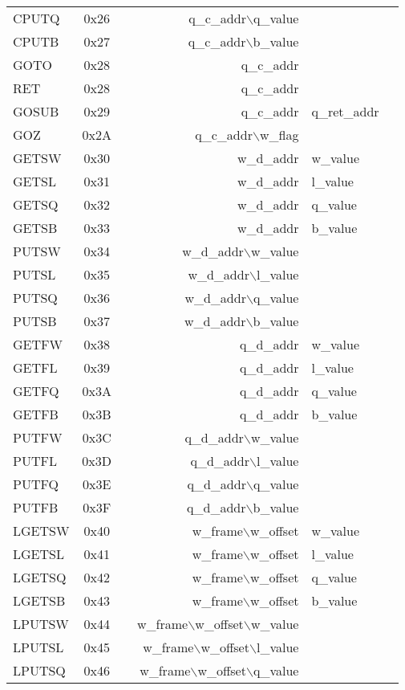 \documentclass {article}
\begin{document}
\begin {tabular}{l|c|l|r@{--}l|l}
CPUTQ	& 0x26	& 		&q\_c\_addr$\backslash$q\_value&\\
CPUTB	& 0x27	& 		&q\_c\_addr$\backslash$b\_value&\\
GOTO	& 0x28	& 		&q\_c\_addr&\\
RET	& 0x28	& 		&q\_c\_addr&\\
GOSUB	& 0x29	& 		&q\_c\_addr&q\_ret\_addr\\
GOZ	& 0x2A	& 		&q\_c\_addr$\backslash$w\_flag&\\
GETSW	& 0x30	& 		&w\_d\_addr&w\_value\\
GETSL	& 0x31	& 		&w\_d\_addr&l\_value\\
GETSQ	& 0x32	& 		&w\_d\_addr&q\_value\\
GETSB	& 0x33	& 		&w\_d\_addr&b\_value\\
PUTSW	& 0x34	& 		&w\_d\_addr$\backslash$w\_value&\\
PUTSL	& 0x35	& 		&w\_d\_addr$\backslash$l\_value&\\
PUTSQ	& 0x36	& 		&w\_d\_addr$\backslash$q\_value&\\
PUTSB	& 0x37	& 		&w\_d\_addr$\backslash$b\_value&\\
GETFW	& 0x38	& 		&q\_d\_addr&w\_value\\
GETFL	& 0x39	& 		&q\_d\_addr&l\_value\\
GETFQ	& 0x3A	& 		&q\_d\_addr&q\_value\\
GETFB	& 0x3B	& 		&q\_d\_addr&b\_value\\
PUTFW	& 0x3C	& 		&q\_d\_addr$\backslash$w\_value&\\
PUTFL	& 0x3D	& 		&q\_d\_addr$\backslash$l\_value&\\
PUTFQ	& 0x3E	& 		&q\_d\_addr$\backslash$q\_value&\\
PUTFB	& 0x3F	& 		&q\_d\_addr$\backslash$b\_value&\\
LGETSW& 0x40	& 		&w\_frame$\backslash$w\_offset&w\_value\\
LGETSL& 0x41	& 		&w\_frame$\backslash$w\_offset&l\_value\\
LGETSQ& 0x42	& 		&w\_frame$\backslash$w\_offset&q\_value\\
LGETSB& 0x43	& 		&w\_frame$\backslash$w\_offset&b\_value\\
LPUTSW& 0x44	& 		&w\_frame$\backslash$w\_offset$\backslash$w\_value&\\
LPUTSL& 0x45	& 		&w\_frame$\backslash$w\_offset$\backslash$l\_value&\\
LPUTSQ& 0x46	& 		&w\_frame$\backslash$w\_offset$\backslash$q\_value&\\

\end{tabular}
\end{document}
